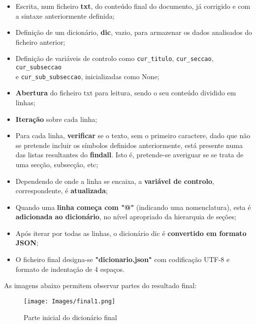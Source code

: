 \begin{itemize}
    \item Escrita, num ficheiro \textbf{txt}, do conteúdo final do documento, já corrigido e com a sintaxe anteriormente definida;
    
    \item Definição de um dicionário, \textbf{dic}, vazio, para armazenar os dados analisados do ficheiro anterior;

    \item Definição de variáveis de controlo como \texttt{cur\_titulo}, \texttt{cur\_seccao}, \texttt{cur\_subseccao} \\
    e \texttt{cur\_sub\_subseccao}, inicializadas como None;

    \item \textbf{Abertura} do ficheiro txt para leitura, sendo o seu conteúdo dividido em linhas;

    \item \textbf{Iteração} sobre cada linha;

    \item Para cada linha, \textbf{verificar} se o texto, sem o primeiro caractere, dado que não se pretende incluir os símbolos definidos anteriormente, está presente numa das listas resultantes do \textbf{findall}. Isto é, pretende-se averiguar se se trata de uma secção, subsecção, etc;

    \item Dependendo de onde a linha se encaixa, a \textbf{variável de controlo}, correspondente, é \textbf{atualizada};

    \item Quando uma \textbf{linha começa com "@"} (indicando uma nomenclatura), esta é \textbf{adicionada ao dicionário}, no nível apropriado da hierarquia de seções;

    \item Após iterar por todas as linhas, o dicionário dic é \textbf{convertido em formato JSON};

    \item O ficheiro final designa-se \textbf{"dicionario.json"} com codificação UTF-8 e formato de indentação de 4 espaços.

\end{itemize}

As imagens abaixo permitem observar partes do resultado final:

\begin{figure}[H]
    \centering
    \centering
    \texttt{[image: Images/final1.png]}
    \caption{Parte inicial do dicionário final}
    \label{fig:final1}
\end{figure}

